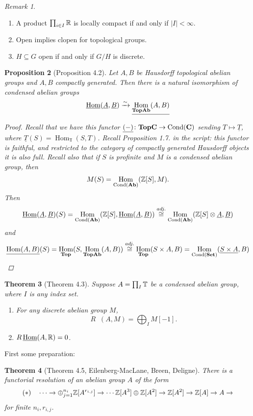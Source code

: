 \documentclass[A4paper, british]{amsart}
\theoremstyle{darkgreentheorem}
\newtheorem{thm}{Theorem}[section]
\newtheorem{prop}[thm]{Proposition}
\theoremstyle{darkbluedefinition}
\theoremstyle{darkredexample}
\theoremstyle{remark}
\newtheorem{rem}[thm]{Remark}
\DeclareMathOperator{\Hom}{Hom}
\DeclareMathOperator{\Cond}{Cond}
\DeclareMathOperator{\ihom}{\underline{Hom}}
\newcommand{\1}{\mathbbm{1}}
\renewcommand{\u}[1]{\underline{#1}}
\newcommand{\ot}{\otimes}
\newcommand{\op}{\oplus}
\newcommand{\tms}{\times}
\newcommand{\sub}{\subseteq}
\begin{document}
\begin{rem}
    \begin{enumerate}[label=\roman*)]
	\item A product $\prod_{i\in I}\mathbb{R}$ is locally compact if and only if $|I|<\infty$.
	\item Open implies clopen for topological groups.
	\item $H\sub G$ open if and only if $G/H$ is discrete.
    \end{enumerate}
\end{rem}

\begin{prop}[Proposition 4.2]
    Let $A,B$ be Hausdorff topological abelian groups and $A,B$ compactly generated.
    Then there is a natural isomorphism of condensed abelian groups
    \[ \ihom(\u{A},\u{B})\xrightarrow{\sim} \u{\Hom_{\Top\Ab}(A,B)} \]
    \begin{proof}
	Recall that we have this functor $\u{(-)}\colon \Top\bfC\to \Cond(\bfC)$ sending $T\mapsto \u{T}$, where $\u{T}(S)=\Hom_{\Top}(S,T)$.
	Recall Proposition 1.7. in the script: this functor is faithful, and restricted to the category of compactly generated Hausdorff objects it is also full.
	Recall also that if $S$ is profinite and $M$ is a condensed abelian group, then
	\[ M(S)=\Hom_{\Cond(\Ab)}(\Z[S],M). \]
	Then
	\[ \ihom(\u{A},\u{B})(S)=\Hom_{\Cond(\Ab)}(\Z[S],\ihom(\u{A},\u{B}))\overset{adj.}{\cong} \Hom_{\Cond(\Ab)}(\Z[S]\ot \u{A}, \u{B}) \]
	and
	\[ \u{\Hom(A,B)}(S)=\Hom_{\Top}(S,\Hom_{\Top\Ab}(A,B))\overset{adj.}{\cong} \Hom_{\Top}(S\tms A,B)=\Hom_{\Cond(\Set)}(\u{S\tms A},B) \]
    \end{proof}
\end{prop}

\begin{thm}[Theorem 4.3]
    Suppose $A=\prod_{I}\mathbb{T}$ be a condensed abelian group, where $I$ is any index set.
    \begin{enumerate}[label=\roman*)]
	\item For any discrete abelian group $M$,
	    \[ R\ihom(A,M)=\bigoplus_{I}M[-1]. \]
	\item $R\ihom(A,\R)=0$.
    \end{enumerate}
\end{thm}

First some preparation:

\begin{thm}[Theorem 4.5, Eilenberg-MacLane, Breen, Deligne]
    There is a functorial resolution of an abelian group $A$ of the form
    \[ (*)\quad \cdots \to \op_{j=1}^{n_{i}}\Z[A^{r_{{i,j}}}]\to \cdots \Z[A^{3}]\op \Z[A^{2}]\to \Z[A^{2}]\to \Z[A]\to A\to \]
    for finite $n_{i},r_{i,j}$.
\end{thm}
\end{document}
